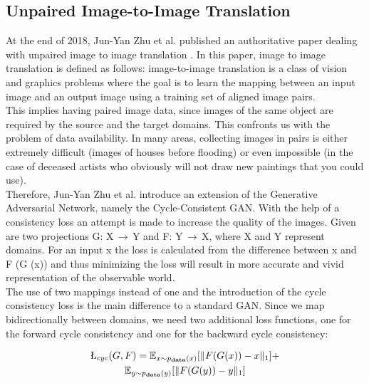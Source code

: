 \subsection{Unpaired Image-to-Image Translation}
    At the end of 2018, Jun-Yan Zhu et al. published an authoritative paper dealing with unpaired image to image translation \cite{zhu2017unpaired}.
    In this paper, image to image translation is defined as follows: image-to-image translation is a class of vision and graphics problems where the goal is to learn the mapping between an input image and an output image using a training set of aligned image pairs.\\
    This implies having paired image data, since images of the same object are required by the source and the target domains. This confronts us with the problem of data availability. In many areas, collecting images in pairs is either extremely difficult (images of houses before flooding) or even impossible (in the case of deceased artists who obviously will not draw new paintings that you could use).\\
    Therefore, Jun-Yan Zhu et al. introduce an extension of the Generative Adversarial Network, namely the Cycle-Consistent GAN. With the help of a consistency loss an attempt is made to increase the quality of the images. Given are two projections G: X$\,\to\,$Y and F: Y$\,\to\,$X, where X and Y represent domains. For an input x the loss is calculated from the difference between x and F (G (x)) and thus minimizing the loss will result in more accurate and vivid representation of the observable world.\\
    The use of two mappings instead of one and the introduction of the cycle consistency loss is the main difference to a standard GAN. Since we map bidirectionally between domains, we need two additional loss functions, one for the forward cycle consistency and one for the backward cycle consistency:
    
    \begin{multline}
                \L_{cyc}(G,F) =  
        \mathbb{E}_{x \sim p_\textbf{data}(x)}
        [ \lVert F(G(x)) - x \rVert_{1} ] + \\
        \mathbb{E}_{y \sim p_\textbf{data}(y)}
        [ \lVert F(G(y)) - y \rVert_{1} ]
    \end{multline}
    
        
